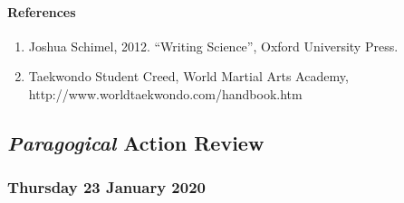 \hypertarget{references}{%
\paragraph{References}\label{references}}

\begin{enumerate}
\def\labelenumi{\arabic{enumi}.}
\tightlist
\item
  Joshua Schimel, 2012. ``Writing Science'', Oxford University Press.
\item
  Taekwondo Student Creed, World Martial Arts Academy,
  http://www.worldtaekwondo.com/handbook.htm
\end{enumerate}

\hypertarget{paragogical-action-review}{%
\subsection{\texorpdfstring{\emph{Paragogical} Action
Review}{Paragogical Action Review}}\label{paragogical-action-review}}

\hypertarget{thursday-23-january-2020}{%
\subsubsection{Thursday 23 January
2020}\label{thursday-23-january-2020}}

